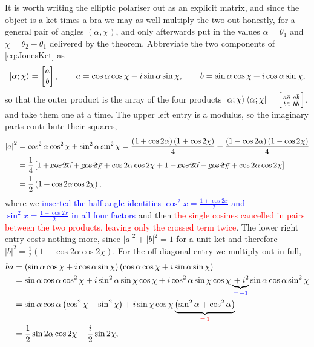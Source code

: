             It is worth writing the elliptic polariser out as an explicit matrix, and since the object is a ket times a bra we may as well multiply the two out honestly, for a general pair of angles $\left(\alpha,\chi\right)$, and only afterwards put in the values $\alpha=\theta_1$ and $\chi=\theta_2-\theta_1$ delivered by the theorem. Abbreviate the two components of \ref{eq:JonesKet} as
            \begin{equation*}
                \ket{\alpha;\chi} = \begin{bmatrix}a\\ b\end{bmatrix}, \qquad a = \cos\alpha\cos\chi-i\sin\alpha\sin\chi, \qquad b = \sin\alpha\cos\chi+i\cos\alpha\sin\chi ,
            \end{equation*}
            so that the outer product is the array of the four products $\ket{\alpha;\chi}\bra{\alpha;\chi}=\left[\begin{smallmatrix}a\bar{a} & a\bar{b}\\ b\bar{a} & b\bar{b}\end{smallmatrix}\right]$, and take them one at a time. The upper left entry is a modulus, so the imaginary parts contribute their squares,
            \begin{align*}
                \left|a\right|^2 &= \cos^2\alpha\cos^2\chi+\sin^2\alpha\sin^2\chi
                = \frac{\left(1+\cos2\alpha\right)\left(1+\cos2\chi\right)}{4}+\frac{\left(1-\cos2\alpha\right)\left(1-\cos2\chi\right)}{4} \\
                &= \frac{1}{4}\left[1+\cancel{\cos2\alpha}+\cancel{\cos2\chi}+\cos2\alpha\cos2\chi+1-\cancel{\cos2\alpha}-\cancel{\cos2\chi}+\cos2\alpha\cos2\chi\right] \\
                &= \frac{1}{2}\left(1+\cos2\alpha\cos2\chi\right),
            \end{align*}
            where we \textcolor{blue}{inserted the half angle identities $\cos^2x=\frac{1+\cos2x}{2}$ and $\sin^2x=\frac{1-\cos2x}{2}$ in all four factors} and then \textcolor{red}{the single cosines cancelled in pairs between the two products, leaving only the crossed term twice}. The lower right entry costs nothing more, since $\left|a\right|^2+\left|b\right|^2=1$ for a unit ket and therefore $\left|b\right|^2=\frac{1}{2}\left(1-\cos2\alpha\cos2\chi\right)$. For the off diagonal entry we multiply out in full,
            \begin{align*}
                b\bar{a} &= \left(\sin\alpha\cos\chi+i\cos\alpha\sin\chi\right)\left(\cos\alpha\cos\chi+i\sin\alpha\sin\chi\right) \\
                &= \sin\alpha\cos\alpha\cos^2\chi+i\sin^2\alpha\sin\chi\cos\chi+i\cos^2\alpha\sin\chi\cos\chi\underbrace{{}+i^2}_{\textcolor{blue}{=\,-1}}\sin\alpha\cos\alpha\sin^2\chi \\
                &= \sin\alpha\cos\alpha\left(\cos^2\chi-\sin^2\chi\right)+i\sin\chi\cos\chi\underbrace{\left(\sin^2\alpha+\cos^2\alpha\right)}_{\textcolor{red}{=\,1}} \\
                &= \frac{1}{2}\sin2\alpha\cos2\chi+\frac{i}{2}\sin2\chi ,
            \end{align*}
